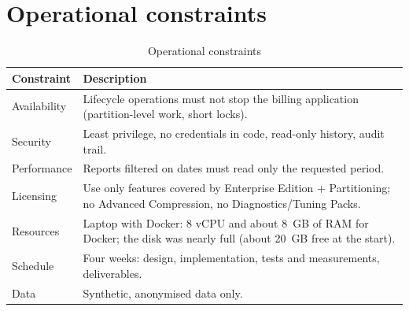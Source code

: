 \section{Operational constraints}

\begin{table}[H]
\centering
\caption{Operational constraints}
\begin{tabularx}{\linewidth}{lL}
\toprule
Constraint & Description \\
\midrule
Availability & Lifecycle operations must not stop the billing application (partition-level work, short locks). \\
Security & Least privilege, no credentials in code, read-only history, audit trail. \\
Performance & Reports filtered on dates must read only the requested period. \\
Licensing & Use only features covered by Enterprise Edition + Partitioning; no Advanced Compression, no Diagnostics/Tuning Packs. \\
Resources & Laptop with Docker: 8 vCPU and about 8~GB of RAM for Docker; the disk was nearly full (about 20~GB free at the start). \\
Schedule & Four weeks: design, implementation, tests and measurements, deliverables. \\
Data & Synthetic, anonymised data only. \\
\bottomrule
\end{tabularx}
\end{table}
